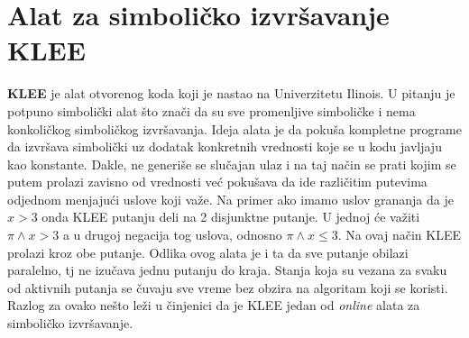 \documentclass[12pt]{article}
\begin{document}
\section{Alat za simboličko izvršavanje KLEE}
\textbf{KLEE} je alat otvorenog koda koji je nastao na Univerzitetu Ilinois. U pitanju je potpuno simbolički alat što znači da su sve promenljive simboličke i nema konkoličkog simboličkog izvršavanja. Ideja alata je da pokuša kompletne programe da izvršava simbolički uz dodatak konkretnih vrednosti koje se u kodu javljaju kao konstante. Dakle, ne generiše se slučajan ulaz i na taj način se prati kojim se putem prolazi zavisno od vrednosti već pokušava da ide različitim putevima odjednom menjajući uslove koji važe. Na primer ako imamo uslov grananja da je $x > 3$ onda KLEE putanju deli na 2 disjunktne putanje. U jednoj će važiti $\pi \land x > 3$ a u drugoj negacija tog uslova, odnosno $\pi \land x \leq 3$. Na ovaj način KLEE prolazi kroz obe putanje. Odlika ovog alata je i ta da sve putanje obilazi paralelno, tj ne izučava jednu putanju do kraja. Stanja koja su vezana za svaku od aktivnih putanja se čuvaju sve vreme bez obzira na algoritam koji se koristi. Razlog za ovako nešto leži u činjenici da je KLEE jedan od \textit{online} alata za simboličko izvršavanje.
\end{document}
